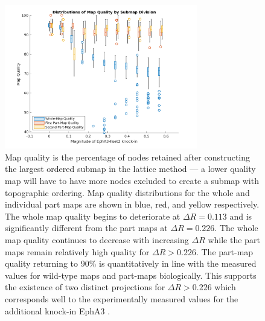 \begin{figure}
	\centering
	\includegraphics[width=0.75\textwidth]{images/lattice/stats_qualities}
	\def\c{Map quality distributions for the whole and individual part maps are shown in blue, red, and yellow respectively.  }
	\caption[\c]{Map quality is the percentage of nodes retained after constructing the largest ordered submap in the lattice method --- a lower quality map will have to have more nodes excluded to create a submap with topographic ordering.  \c The whole map quality begins to deteriorate at $\Delta R = 0.113$ and is significantly different from the part maps at $\Delta R = 0.226$. The whole map quality continues to decrease with increasing $\Delta R$ while the part maps remain relatively high quality for $\Delta R > 0.226$. The part-map quality returning to 90\% is quantitatively in line with the measured values for wild-type maps and part-maps biologically. This supports the existence of two distinct projections for $\Delta R > 0.226$ which corresponds well to the experimentally measured values for the additional knock-in EphA3 \cite{Hjorth2015-le}. \label{fig:mapquality} } 
\end{figure}
\FloatBarrier
